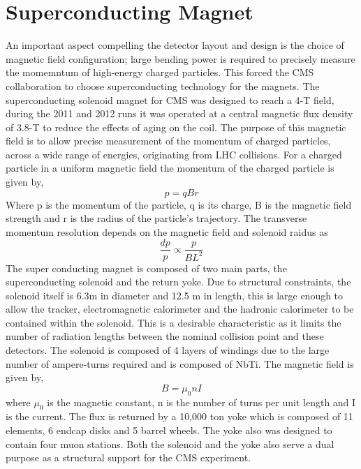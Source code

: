 \section{Superconducting Magnet}
An important aspect compelling the detector layout and design is the choice of 
magnetic field configuration; large bending power is required to precisely 
measure the momemntum of high-energy charged particles. This forced the CMS
collaboration to choose superconducting technology for the magnets.
The superconducting solenoid magnet for CMS was designed to reach a 4-T field,
during the 2011 and 2012 runs it was operated at a central magnetic flux
density of 3.8-T to reduce the effects of aging on the coil. %
The purpose of this magnetic field is to allow precise measurement of the 
momentum of charged particles, across a wide range of energies, originating from LHC collisions. 
For a charged particle in a uniform magnetic field the  momentum of the charged particle is given by,
\begin{displaymath}
p=qBr
\end{displaymath}  
Where p is the momentum of the particle, q is its charge, B is the 
magnetic field strength and r is the radius of the particle's trajectory.
The transverse momentum resolution depends on the magnetic field and
solenoid raidus as
\begin{displaymath}
\frac{dp}{p}\propto\frac{p}{BL^{2}}
\end{displaymath}
The super conducting magnet is composed of two main parts, the superconducting
solenoid and the return yoke.
Due to structural constraints, the solenoid itself is 6.3m in diameter and 12.5 m in length,
this is large enough to allow the tracker, electromagnetic calorimeter
and the hadronic calorimeter to be contained within the solenoid. This is
a desirable characteristic as it limits the number of radiation
lengths between the nominal collision point and these detectors. The solenoid
is composed of 4 layers of windings due to the large number of ampere-turns required
and is composed of NbTi. 
The magnetic field is given by,
\begin{displaymath}
B=\mu_{0}nI
\end{displaymath}
where $\mu_{0}$ is the magnetic constant, n is the number of turns per unit length and 
I is the current. 
The flux is returned by a 10,000 ton yoke which is composed of 11 elements, 6 endcap disks 
and 5 barrel wheels. The yoke also was designed to contain four muon stations. 
Both the solenoid and the yoke also serve a dual purpose as a structural support 
for the CMS experiment. 